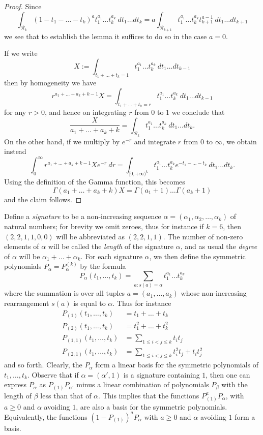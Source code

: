 \documentclass{bmcart}
\theoremstyle{plain}
\theoremstyle{definition}
\begin{document}
\begin{proof}
Since
$$ \int_{{\mathcal R}_k} (1-t_1-\dots-t_k)^a t_1^{a_1} \dots t_k^{a_k}\ dt_1 \dots dt_k = a \int_{{\mathcal R}_{k+1}} t_1^{a_1} \dots t_k^{a_k} t_{k+1}^{a-1}\ dt_1 \dots dt_{k+1}$$
we see that to establish the lemma it suffices to do so in the case $a=0$.

If we write
$$ X := \int_{t_1+\dots+t_k=1} t_1^{a_1} \dots t_k^{a_k}\ dt_1 \dots dt_{k-1}$$
then by homogeneity we have
$$ r^{a_1+\dots+a_k+k-1} X = \int_{t_1+\dots+t_k=r} t_1^{a_1} \dots t_k^{a_k}\ dt_1 \dots dt_{k-1}$$
for any $r > 0$, and hence on integrating $r$ from $0$ to $1$ we conclude that
$$ \frac{X}{a_1+\dots+a_k+k} = \int_{{\mathcal R}_k} t_1^{a_1} \dots t_k^{a_k}\ dt_1 \dots dt_k.$$
On the other hand, if we multiply by $e^{-r}$ and integrate $r$ from $0$ to $\infty$, we obtain instead
$$ \int_0^\infty r^{a_1+\dots+a_k+k-1} X e^{-r}\ dr = \int_{[0,+\infty)^k} t_1^{a_1} \dots t_k^{a_k} e^{-t_1-\dots-t_k}\ dt_1 \dots dt_k.$$
Using the definition of the Gamma function, this becomes
$$ \Gamma(a_1+\dots+a_k+k) X = \Gamma(a_1+1) \dots \Gamma(a_k+1)$$
and the claim follows.
\end{proof}

Define a \emph{signature} to be a non-increasing sequence $\alpha = (\alpha_1,\alpha_2,\dots,\alpha_k)$ of natural numbers; for brevity we omit zeroes, thus for instance if $k=6$, then $(2,2,1,1,0,0)$ will be abbreviated as $(2,2,1,1)$.  The number of non-zero elements of $\alpha$ will be called the \emph{length} of the signature $\alpha$, and as usual the \emph{degree} of $\alpha$ will be $\alpha_1+\dots+\alpha_k$.  For each signature $\alpha$, we then define the symmetric polynomials $P_\alpha = P^{(k)}_\alpha$ by the formula
$$
P_\alpha(t_1,\dots,t_k) = \sum_{a: s(a)=\alpha} t_1^{a_1} \dots t_k^{a_k}$$
where the summation is over all tuples $a = (a_1,\dots,a_k)$ whose non-increasing rearrangement $s(a)$ is equal to $\alpha$.  Thus for instance
\begin{align*}
P_{(1)}(t_1,\dots,t_k) &= t_1 + \dots + t_k \\
P_{(2)}(t_1,\dots,t_k) &= t_1^2 + \dots + t_k^2 \\
P_{(1,1)}(t_1,\dots,t_k) &= \sum_{1 \leq i < j \leq k} t_i t_j \\
P_{(2,1)}(t_1,\dots,t_k) &= \sum_{1 \leq i < j \leq k} t_i^2 t_j + t_i t_j^2
\end{align*}
and so forth.  Clearly, the $P_\alpha$ form a linear basis for the symmetric polynomials of $t_1,\dots,t_k$.  Observe that if $\alpha = (\alpha',1)$ is a signature containing $1$, then one can express $P_\alpha$ as $P_{(1)} P_{\alpha'}$ minus a linear combination of polynomials $P_\beta$ with the length of $\beta$ less than that of $\alpha$.  This implies that the functions $P_{(1)}^a P_\alpha$, with $a \geq 0$ and $\alpha$ avoiding $1$, are also a basis for the symmetric polynomials.  Equivalently, the functions $(1-P_{(1)})^a P_\alpha$ with $a \geq 0$ and $\alpha$ avoiding $1$ form a basis.
\end{document}
